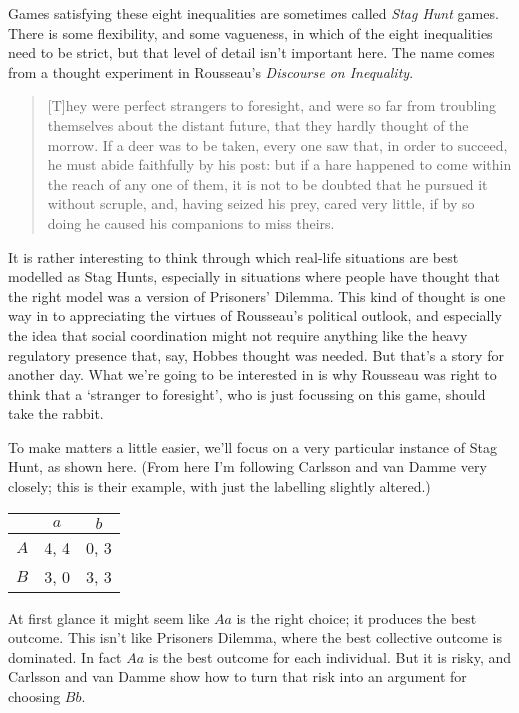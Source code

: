Games satisfying these eight inequalities are sometimes called \emph{Stag Hunt} games. There is some flexibility, and some vagueness, in which of the eight inequalities need to be strict, but that level of detail isn't important here. The name comes from a thought experiment in Rousseau's \emph{Discourse on Inequality}. 

\begin{quote}

[T]hey were perfect strangers to foresight, and were so far from troubling themselves about the distant future, that they hardly thought of the morrow. If a deer was to be taken, every one saw that, in order to succeed, he must abide faithfully by his post: but if a hare happened to come within the reach of any one of them, it is not to be doubted that he pursued it without scruple, and, having seized his prey, cared very little, if by so doing he caused his companions to miss theirs. ~\citep[209--10]{Rousseau1913}
\end{quote}
It is rather interesting to think through which real-life situations are best modelled as Stag Hunts, especially in situations where people have thought that the right model was a version of Prisoners' Dilemma. This kind of thought is one way in to appreciating the virtues of Rousseau's political outlook, and especially the idea that social coordination might not require anything like the heavy regulatory presence that, say, Hobbes thought was needed. But that's a story for another day. What we're going to be interested in is why Rousseau was right to think that a `stranger to foresight', who is just focussing on this game, should take the rabbit.

To make matters a little easier, we'll focus on a very particular instance of Stag Hunt, as shown here. (From here I'm following Carlsson and van Damme very closely; this is their example, with just the labelling slightly altered.)


\begin{center}
\begin{tabular}{r | c c}
& $a$ & $b$  \\\hline
$A$ & 4, 4 & 0, 3 \\
$B$ & 3, 0 & 3, 3
\end{tabular}
\end{center}


At first glance it might seem like $Aa$ is the right choice; it produces the best outcome. This isn't like Prisoners Dilemma, where the best collective outcome is dominated. In fact $Aa$ is the best outcome for each individual. But it is risky, and Carlsson and van Damme show how to turn that risk into an argument for choosing $Bb$.

